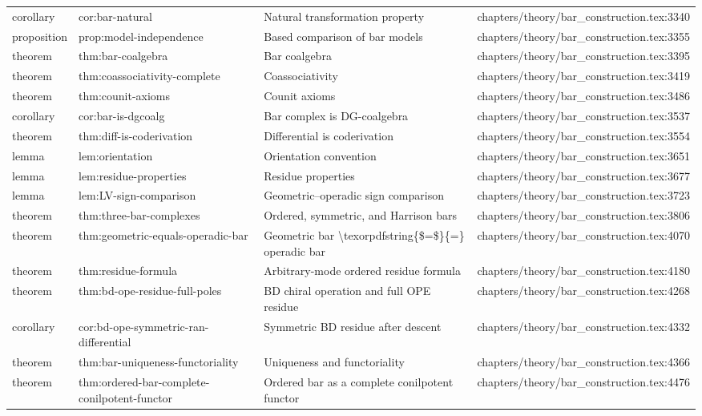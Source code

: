 \documentclass[11pt]{article}
\begin{document}
\begin{longtable}{L{0.10\textwidth}L{0.26\textwidth}L{0.42\textwidth}L{0.22\textwidth}}
corollary & cor:bar-natural & Natural transformation property & chapters/theory/bar\_construction.tex:3340\\
proposition & prop:model-independence & Based comparison of bar models & chapters/theory/bar\_construction.tex:3355\\
theorem & thm:bar-coalgebra & Bar coalgebra & chapters/theory/bar\_construction.tex:3395\\
theorem & thm:coassociativity-complete & Coassociativity & chapters/theory/bar\_construction.tex:3419\\
theorem & thm:counit-axioms & Counit axioms & chapters/theory/bar\_construction.tex:3486\\
corollary & cor:bar-is-dgcoalg & Bar complex is DG-coalgebra & chapters/theory/bar\_construction.tex:3537\\
theorem & thm:diff-is-coderivation & Differential is coderivation & chapters/theory/bar\_construction.tex:3554\\
lemma & lem:orientation & Orientation convention & chapters/theory/bar\_construction.tex:3651\\
lemma & lem:residue-properties & Residue properties & chapters/theory/bar\_construction.tex:3677\\
lemma & lem:LV-sign-comparison & Geometric--operadic sign comparison & chapters/theory/bar\_construction.tex:3723\\
theorem & thm:three-bar-complexes & Ordered, symmetric, and Harrison bars & chapters/theory/bar\_construction.tex:3806\\
theorem & thm:geometric-equals-operadic-bar & Geometric bar \textbackslash{}texorpdfstring\{\$=\$\}\{=\} operadic bar & chapters/theory/bar\_construction.tex:4070\\
theorem & thm:residue-formula & Arbitrary-mode ordered residue formula & chapters/theory/bar\_construction.tex:4180\\
theorem & thm:bd-ope-residue-full-poles & BD chiral operation and full OPE residue & chapters/theory/bar\_construction.tex:4268\\
corollary & cor:bd-ope-symmetric-ran-differential & Symmetric BD residue after descent & chapters/theory/bar\_construction.tex:4332\\
theorem & thm:bar-uniqueness-functoriality & Uniqueness and functoriality & chapters/theory/bar\_construction.tex:4366\\
theorem & thm:ordered-bar-complete-conilpotent-functor & Ordered bar as a complete conilpotent functor & chapters/theory/bar\_construction.tex:4476\\

\end{longtable}
\end{document}
